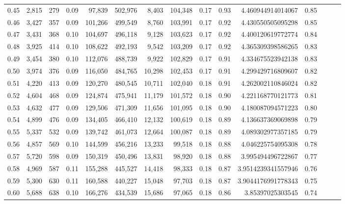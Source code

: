 \begin{tabular}{rrrrrrrrrrrrrrr}
0.45 &   2,815 &    279 &  0.09 &   97,839 &  502,976 &    8,403 &  104,348 &  0.17 &  0.93 &     4.460944914014067 &      0.85 \\
0.46 &   3,427 &    357 &  0.09 &  101,266 &  499,549 &    8,760 &  103,991 &  0.17 &  0.92 &     4.430550505095298 &      0.85 \\
0.47 &   3,431 &    368 &  0.10 &  104,697 &  496,118 &    9,128 &  103,623 &  0.17 &  0.92 &     4.400120619772774 &      0.84 \\
0.48 &   3,925 &    414 &  0.10 &  108,622 &  492,193 &    9,542 &  103,209 &  0.17 &  0.92 &     4.365309398586265 &      0.83 \\
0.49 &   3,454 &    380 &  0.10 &  112,076 &  488,739 &    9,922 &  102,829 &  0.17 &  0.91 &     4.334675523942138 &      0.83 \\
0.50 &   3,974 &    376 &  0.09 &  116,050 &  484,765 &   10,298 &  102,453 &  0.17 &  0.91 &     4.299429716809607 &      0.82 \\
0.51 &   4,220 &    413 &  0.09 &  120,270 &  480,545 &   10,711 &  102,040 &  0.18 &  0.91 &     4.262002110846024 &      0.82 \\
0.52 &   4,604 &    468 &  0.09 &  124,874 &  475,941 &   11,179 &  101,572 &  0.18 &  0.90 &     4.221168770121773 &      0.81 \\
0.53 &   4,632 &    477 &  0.09 &  129,506 &  471,309 &   11,656 &  101,095 &  0.18 &  0.90 &     4.180087094571223 &      0.80 \\
0.54 &   4,899 &    476 &  0.09 &  134,405 &  466,410 &   12,132 &  100,619 &  0.18 &  0.89 &     4.136637369069898 &      0.79 \\
0.55 &   5,337 &    532 &  0.09 &  139,742 &  461,073 &   12,664 &  100,087 &  0.18 &  0.89 &     4.089302977357185 &      0.79 \\
0.56 &   4,857 &    569 &  0.10 &  144,599 &  456,216 &   13,233 &   99,518 &  0.18 &  0.88 &     4.046225754095308 &      0.78 \\
0.57 &   5,720 &    598 &  0.09 &  150,319 &  450,496 &   13,831 &   98,920 &  0.18 &  0.88 &     3.995494496722867 &      0.77 \\
0.58 &   4,969 &    587 &  0.11 &  155,288 &  445,527 &   14,418 &   98,333 &  0.18 &  0.87 &    3.9514239341557946 &      0.76 \\
0.59 &   5,300 &    630 &  0.11 &  160,588 &  440,227 &   15,048 &   97,703 &  0.18 &  0.87 &    3.9044176991778343 &      0.75 \\
0.60 &   5,688 &    638 &  0.10 &  166,276 &  434,539 &   15,686 &   97,065 &  0.18 &  0.86 &      3.85397025303545 &      0.74 \\

\end{tabular}
